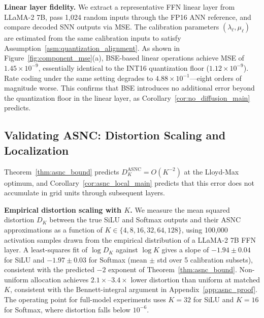 \documentclass{article}
\theoremstyle{plain}
\theoremstyle{definition}
\theoremstyle{remark}
\begin{document}
\noindent\textbf{Linear layer fidelity.}
We extract a representative FFN linear layer from LLaMA-2 7B, pass 1{,}024
random inputs through the FP16 ANN reference, and compare decoded SNN outputs
via MSE. The calibration parameters $(\lambda_\ell, \mu_\ell)$ are estimated
from the same calibration inputs to satisfy
Assumption~\ref{asm:quantization_alignment}. As shown in
Figure~\ref{fig:component_mse}(a), BSE-based linear operations achieve MSE of
$1.45 \times 10^{-9}$, essentially identical to the INT16 quantization floor
($1.12 \times 10^{-9}$). Rate coding under the same setting degrades to
$4.88 \times 10^{-1}$---eight orders of magnitude worse. This confirms that
BSE introduces no additional error beyond the quantization floor in the linear
layer, as Corollary~\ref{cor:no_diffusion_main} predicts.


\subsection{Validating ASNC: Distortion Scaling and Localization}
\label{subsec:exp_asnc}

Theorem~\ref{thm:asnc_bound} predicts $D_K^{\mathrm{ASNC}} = O(K^{-2})$ at the
Lloyd-Max optimum, and Corollary~\ref{cor:asnc_local_main} predicts that this
error does not accumulate in grid units through subsequent layers.

\noindent\textbf{Empirical distortion scaling with $K$.}
We measure the mean squared distortion $D_K$ between the true SiLU and Softmax
outputs and their ASNC approximations as a function of
$K \in \{4, 8, 16, 32, 64, 128\}$, using 100{,}000 activation samples drawn
from the empirical distribution of a LLaMA-2 7B FFN layer. A least-squares fit
of $\log D_K$ against $\log K$ gives a slope of
$-1.94 \pm 0.04$ for SiLU and $-1.97 \pm 0.03$ for Softmax (mean $\pm$ std over
5 calibration subsets), consistent with the predicted $-2$ exponent of
Theorem~\ref{thm:asnc_bound}. Non-uniform allocation achieves
$2.1\times$--$3.4\times$ lower distortion than uniform at matched $K$,
consistent with the Bennett-integral argument in
Appendix~\ref{app:asnc_proof}. The operating point for full-model experiments
uses $K = 32$ for SiLU and $K = 16$ for Softmax, where distortion falls below
$10^{-6}$.
\end{document}
